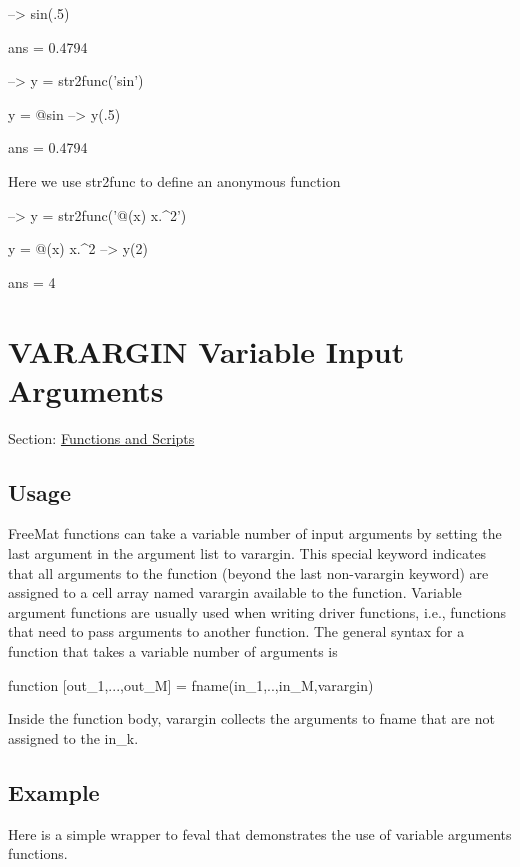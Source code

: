 \begin{DoxyVerbInclude}
--> sin(.5)              %

ans = 
    0.4794 

--> y = str2func('sin')  %

y = 
 @sin
--> y(.5)                %

ans = 
    0.4794 
\end{DoxyVerbInclude}


Here we use {\ttfamily str2func} to define an anonymous function


\begin{DoxyVerbInclude}
--> y = str2func('@(x) x.^2')

y = 
 @(x)   x.^2
--> y(2)

ans = 
 4 
\end{DoxyVerbInclude}
 \hypertarget{functions_varargin}{}\section{V\-A\-R\-A\-R\-G\-I\-N Variable Input Arguments}\label{functions_varargin}
Section\-: \hyperlink{sec_functions}{Functions and Scripts} \hypertarget{vtkwidgets_vtkxyplotwidget_Usage}{}\subsection{Usage}\label{vtkwidgets_vtkxyplotwidget_Usage}
Free\-Mat functions can take a variable number of input arguments by setting the last argument in the argument list to {\ttfamily varargin}. This special keyword indicates that all arguments to the function (beyond the last non-\/{\ttfamily varargin} keyword) are assigned to a cell array named {\ttfamily varargin} available to the function. Variable argument functions are usually used when writing driver functions, i.\-e., functions that need to pass arguments to another function. The general syntax for a function that takes a variable number of arguments is \begin{DoxyVerb}  function [out_1,...,out_M] = fname(in_1,..,in_M,varargin)
\end{DoxyVerb}
 Inside the function body, {\ttfamily varargin} collects the arguments to {\ttfamily fname} that are not assigned to the {\ttfamily in\-\_\-k}. \hypertarget{variables_struct_Example}{}\subsection{Example}\label{variables_struct_Example}
Here is a simple wrapper to {\ttfamily feval} that demonstrates the use of variable arguments functions.

